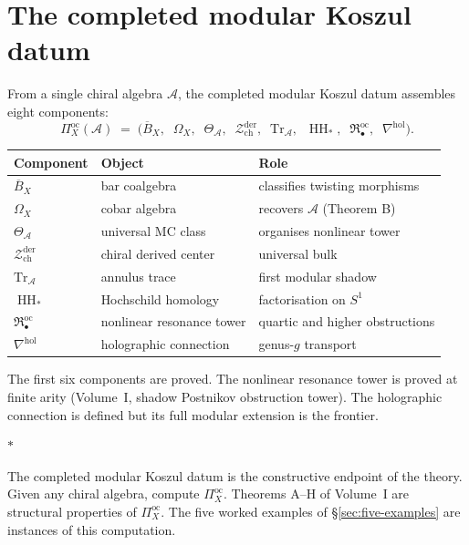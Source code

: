 \documentclass[11pt]{article}
\newcommand{\cA}{\mathcal{A}}
\newcommand{\cZ}{\mathcal{Z}}
\newcommand{\barB}{\overline{B}}
\newcommand{\HH}{\operatorname{HH}}
\newcommand{\Zder}{\cZ^{\mathrm{der}}_{\mathrm{ch}}}
\newcommand{\sep}{\bigskip\begin{center}$*$\end{center}\medskip}
\begin{document}
\section{The completed modular Koszul datum}
\label{sec:platonic}

From a single chiral algebra $\cA$, the completed modular Koszul datum
assembles eight components:
\[
\Pi^{\mathrm{oc}}_X(\cA)
\;=\;
\bigl(\barB_X,\;\; \Omega_X,\;\; \Theta_\cA,\;\;
\Zder,\;\; \mathrm{Tr}_\cA,\;\;
\HH_*,\;\; \mathfrak{R}^{\mathrm{oc}}_\bullet,\;\;
\nabla^{\mathrm{hol}}\bigr).
\]

\begin{center}
\small
\renewcommand{\arraystretch}{1.15}
\begin{tabular}{@{}lll@{}}
\textbf{Component} & \textbf{Object} & \textbf{Role} \\
\hline
$\barB_X$ & bar coalgebra & classifies twisting morphisms \\[3pt]
$\Omega_X$ & cobar algebra & recovers $\cA$ (Theorem B) \\[3pt]
$\Theta_\cA$ & universal MC class & organises nonlinear tower \\[3pt]
$\Zder$ & chiral derived center & universal bulk \\[3pt]
$\mathrm{Tr}_\cA$ & annulus trace
  & first modular shadow \\[3pt]
$\HH_*$ & Hochschild homology & factorisation on $S^1$ \\[3pt]
$\mathfrak{R}^{\mathrm{oc}}_\bullet$ & nonlinear resonance tower
  & quartic and higher obstructions \\[3pt]
$\nabla^{\mathrm{hol}}$ & holographic connection
  & genus-$g$ transport
\end{tabular}
\end{center}

\medskip

The first six components are proved.  The nonlinear resonance
tower is proved at finite arity (Volume~I, shadow Postnikov obstruction tower).
The holographic connection is defined but its full modular
extension is the frontier.

\sep

The completed modular Koszul datum is the constructive endpoint of the
theory.  Given any chiral algebra, compute $\Pi^{\mathrm{oc}}_X$.
Theorems A--H of Volume~I are structural properties of
$\Pi^{\mathrm{oc}}_X$.  The five worked examples of
\S\ref{sec:five-examples} are instances of this computation.
\end{document}
